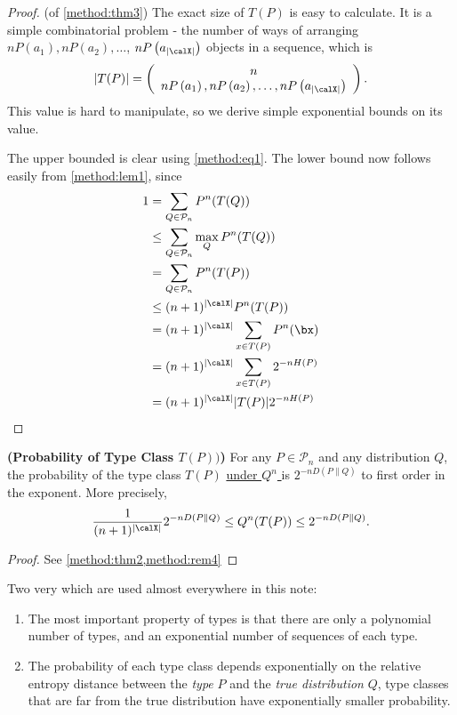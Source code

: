 \documentclass{article}
\newcommand{\typss}{\mathcal{P}_n}
\begin{document}
\begin{proof}{(of \cref{method:thm3})}
The exact size of $T(P)$ is easy to calculate. It is a simple combinatorial problem - the number of ways of arranging $n P\left(a_{1}\right), n P\left(a_{2}\right), \ldots$, $n P\left(a_{| \calX |}\right)$ objects in a sequence, which is
\begin{align}
|T(P)|=\left(\begin{array}{c}
n \\
n P\left(a_{1}\right), n P\left(a_{2}\right), \ldots, n P\left(a_{| \calX |}\right)
\end{array}\right) .
\end{align}
This value is hard to manipulate, so we derive simple exponential bounds on its value.

The upper bounded is clear using \cref{method:eq1}. The lower bound now follows easily from \cref{method:lem1}, since
\begin{align*}
\begin{aligned}
1 &=\sum_{Q \in \typss} P^{n}(T(Q)) \\
& \leq \sum_{Q \in \typss} \max _{Q} P^{n}(T(Q)) \\
&=\sum_{Q \in \typss} P^{n}(T(P)) \\
& \leq(n+1)^{| \calX |} P^{n}(T(P)) \\
&=(n+1)^{| \calX |} \sum_{ x \in T(P)} P^{n}( \bx ) \\
&=(n+1)^{| \calX |} \sum_{ x \in T(P)} 2^{-n H(P)} \\
&=(n+1)^{| \calX |}|T(P)| 2^{-n H(P)}
\end{aligned}
\end{align*}
\end{proof}



\begin{thma}{\bf{(Probability of Type Class $T(P))$)}}\label{method:thm4}
For any $P \in \typss$ and any
distribution $Q$, the probability of the type class $T(P)$ \uline{under $Q^{n}$ } is $2^{-n D(P \| Q)}$ to first order in the exponent. More precisely,
\begin{align*}
\frac{1}{(n+1)^{| \calX |}} 2^{-n D(P \| Q)} \leq Q^{n}(T(P)) \leq 2^{-n D(P \| Q)}.
\end{align*}
\end{thma} 
\begin{proof}
See \cref{method:thm2,method:rem4}
\end{proof}

Two very  which are used almost everywhere in this note:
\begin{enumerate}
    \item The most important property of types is that there are only a polynomial number of types, and an exponential number of sequences of each type.
    \item The probability of each type class depends exponentially on the relative entropy distance between the \emph{type} $P$ and the \emph{true distribution} $Q$, type classes that are far from the true distribution have exponentially smaller probability.
\end{enumerate}
\end{document}
